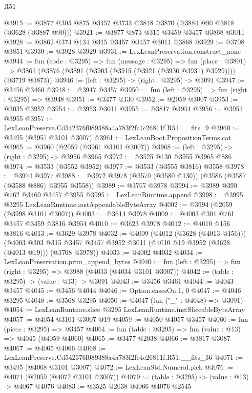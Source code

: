 \begin{lexlean}{R51}
\begin{coremodule}
@3915 := @3877 @305 @875 @3457 @3733 @3818 @3870 (@3884 @90 @3818 (@3628 (@3887 @90)))
@3921 := @3877 @873 @315 @3459 @3457 @3868 @3011
@3928 := @3862 @374 @134 @315 @3457 @3457 @3011 @3868
@3929 := @3708 @3851
@3930 := @3928 @3929
@3931 := LexLeanPreservation.construct_none
@3944 := fun (code : @3295) =>
  fun (message : @3295) =>
  fun (place : @3801) =>
  @3861 (@3876 (@3891 (@3903 (@3915 (@3921 (@3930 @3931) @3929)))) (@3719 @3873))
@3946 := (left : @3295) -> (right : @3295) -> @3091
@3947 := @3456 @3460
@3948 := @3947 @3457
@3950 := fun (left : @3295) => fun (right : @3295) => @3948
@3951 := @3477 @130
@3952 := @2059 @3007
@3953 := @3035 @3952
@3954 := @3953 @3011
@3955 := @3817 @3954
@3956 := @3951 @3955
@3957 := LexLeanPreserve.Cd542376f089388a4a783f2fc4c26811f.R51.__fits_9
@3960 := @3495 (@3957 @3101 @3007)
@3961 := LexLeanBoot.PropositionTerms.cat
@3965 := @3960 (@2059 (@3961 @3101 @3007))
@3968 := (left : @3295) -> (right : @3295) -> @3956 @3965
@3972 := @3525 @130 @3955 @3965 @886
@3974 := @3533 (@3552 @3952)
@3977 := @3533 (@3555 @3816) @3558
@3978 := @3974 @3977
@3988 := @3972 @3978 (@3570 (@3580 @130)) (@3586 (@3587 (@3588 @886) @3955 @3558))
@3989 := @3767 @3978
@3994 := @3989 @390 @762 @3460 @3457 @3955
@3995 := LexLeanRuntime.append
@3998 := @3995 @3295 LexLeanRuntime.instAppendableByteArray
@4002 := @3994 (@2059 (@3998 @3101 @3007))
@4003 := @3614 @3978
@4009 := @4003 @301 @761 @3457 @3459 @3816 @3954
@4010 := @3623 @3978
@4012 := @4010 @156 @3816
@4013 := @3629 @3978
@4032 := @4009
    (@4012 (@3628 (@4013 @156)))
    (@4003 @303 @315 @3457 @3457 @3952 @3011 (@4010 @19 @3952 (@3628 (@4013 @19))) (@3708 @3978))
@4033 := @4002 @4032
@4034 := LexLeanPreservation.prim_append_bytes
@4040 := fun (left : @3295) => fun (right : @3295) => @3988 (@4033 (@4034 @3101 @3007))
@4042 := (table : @3295) -> (value : @13) -> @3091
@4043 := @3456 @3461
@4044 := @4043 @3457
@4045 := @3456 @4044
@4046 := Option.casesOn.{1, 0}
@4047 := @4046 @3295
@4048 := @3568 @3295
@4050 := @4047 (fun ("_" : @4048) => @3091)
@4054 := LexLeanRuntime.slice @3295 LexLeanRuntime.instSliceableByteArray
@4057 := @4054 @3101 @3007 @19
@4059 := @4050 @4057 @3457
@4060 := fun (piece : @3295) => @3457
@4064 := fun (table : @3295) => fun (value : @13) => @4045 (@4059 @4060)
@4065 := @3477 @2038
@4066 := @3817 @3087
@4067 := @4065 @4066
@4068 := LexLeanPreserve.Cd542376f089388a4a783f2fc4c26811f.R51.__fits_36
@4071 := @3495 (@4068 @3101 @3007)
@4072 := LexLeanStd.Numeral.pick
@4076 := @4071 (@2059 (@4072 @3101 @3007))
@4079 := (table : @3295) -> (value : @13) -> @4067 @4076
@4083 := @3525 @2038 @4066 @4076 @2545

\end{coremodule}
\end{lexlean}
